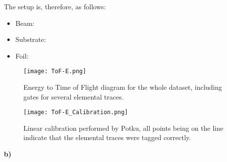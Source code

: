 The setup is, therefore, as follows: 
\begin{itemize}
    \item Beam: 
    \item Substrate: 
    \item Foil: 
\end{itemize}
\newpage

\begin{figure}[h!]
    \centering
    \texttt{[image: ToF-E.png]}
    \caption{Energy to Time of Flight diagram for the whole dataset, including gates for several elemental traces.}
    \label{fig:tof}
\end{figure}

\begin{figure}[h!]
    \centering
    \texttt{[image: ToF-E\_Calibration.png]}
    \caption{Linear calibration performed by Potku, all points being on the line indicate that the elemental traces were tagged correctly.}
    \label{fig:calib}
\end{figure}
\newpage

\textbf{b)}